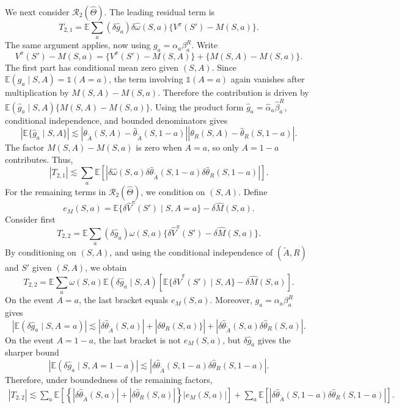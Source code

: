 \documentclass[12pt]{article}
\newcommand{\0}{\boldsymbol{0}}
\newcommand{\E}{\mathbb{E}}
\begin{document}
We next consider \(\mathcal R_2(\widehat\Theta)\). The leading residual term is
\[
T_{2,1}=\E\sum_a(\delta \widehat g_a)\delta \widehat \omega(S,a)\{V^\pi(S')-M(S,a)\}.
\]
The same argument applies, now using \(g_a=\alpha_a\beta^R_a\). Write
\[
V^\pi(S')-M(S,a)=\{V^\pi(S')-M(S,A)\}+\{M(S,A)-M(S,a)\}.
\]
The first part has conditional mean zero given \((S,A)\). Since \(\E(g_a\mid S,A)=\mathds 1(A=a)\), the term involving \(\mathds 1(A=a)\) again vanishes after multiplication by \(M(S,A)-M(S,a)\). Therefore the contribution is driven by \(\E(\widehat g_a\mid S,A)\{M(S,A)-M(S,a)\}\). Using the product form \(\widehat g_a=\widehat\alpha_a\widehat\beta^R_a\), conditional independence, and bounded denominators gives
\[
|\E\{\widehat g_a\mid S,A\}|\lesssim|\theta_{\widetilde A}(S,A)-\widehat\theta_{\widetilde A}(S,1-a)||\theta_R(S,A)-\widehat\theta_R(S,1-a)|.
\]
The factor \(M(S,A)-M(S,a)\) is zero when \(A=a\), so only \(A=1-a\) contributes. Thus,
\[
|T_{2,1}|\lesssim\sum_a\E\left[|\delta \widehat \omega(S,a)\delta \widehat \theta_{\widetilde A}(S,1-a)\delta \widehat \theta_R(S,1-a)|\right].
\]
For the remaining terms in \(\mathcal R_2(\widehat\Theta)\), we condition on \((S,A)\). Define 
\[
e_M(S,a)=\E\{\delta \widehat V^\pi(S')\mid S,A=a\}-\delta \widehat M(S,a).
\]
Consider first
\[
T_{2,2}=\E\sum_a(\delta \widehat g_a)\omega(S,a)\{\delta \widehat V^\pi(S')-\delta \widehat M(S,a)\}.
\]
By conditioning on \((S,A)\), and using the conditional independence of \((\widetilde A,R)\) and \(S'\) given \((S,A)\), we obtain
\[
T_{2,2}=\E\sum_a\omega(S,a)\E(\delta \widehat g_a\mid S,A)\left[\E\{\delta \widehat V^\pi(S')\mid S,A\}-\delta \widehat M(S,a)\right].
\]
On the event \(A=a\), the last bracket equals \(e_M(S,a)\). Moreover, \(g_a=\alpha_a\beta_a^R\) gives
\[
|\E(\delta \widehat g_a\mid S,A=a)|\lesssim |\delta \widehat \theta_{\widetilde A}(S,a)|+|\delta \widehat \theta_R(S,a)\}|+|\delta \widehat \theta_{\widetilde A}(S,a)\delta \widehat \theta_R(S,a)|.
\]
On the event \(A=1-a\), the last bracket is not \(e_M(S,a)\), but $\delta \widehat g_a$ gives the sharper bound
\[
|\E(\delta \widehat g_a\mid S,A=1-a)|\lesssim |\delta \widehat \theta_{\widetilde A}(S,1-a)\delta \widehat \theta_R(S,1-a)|.
\]
Therefore, under boundedness of the remaining factors,
\[
\begin{aligned}
|T_{2,2}|\lesssim
\sum_a\mathbb E\!\left[\left\{|\delta\widehat\theta_{\widetilde A}(S,a)|
+|\delta\widehat\theta_R(S,a)|\right\}|e_M(S,a)|\right] 
+\sum_a\mathbb E\!\left[|\delta\widehat\theta_{\widetilde A}(S,1-a)\delta\widehat\theta_R(S,1-a)|\right].
\end{aligned}
\]
\end{document}
